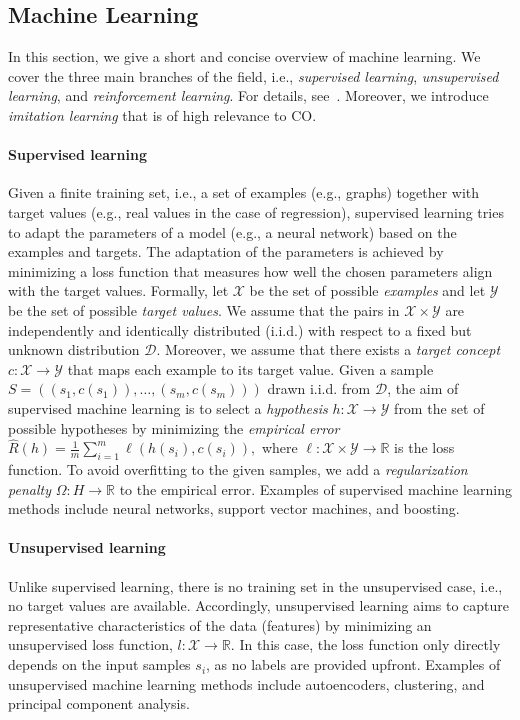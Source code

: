 \documentclass[twoside,11pt]{article}
\newcommand{\new}[1]{\emph{#1}}
\newcommand{\bbR}{\ensuremath{\mathbb{R}}}
\newcommand{\RR}{\mathbb{R}}
\begin{document}
\subsection{Machine Learning}
\label{sec:mlparadigms}

In this section, we give a short and concise overview of machine learning. We cover the three main branches of the field, i.e., \new{supervised learning}, \new{unsupervised learning}, and \new{reinforcement learning}. For details, see~\cite{Moh+2012,Shalev-Shwartz2014}. Moreover, we introduce \new{imitation learning} that is of high relevance to CO.

\paragraph{Supervised learning} Given a finite training set, i.e., a set of examples (e.g., graphs) together with target values (e.g., real values in the case of regression), supervised learning tries to adapt the parameters of a model (e.g., a neural network) based on the examples and targets. The adaptation of the parameters is achieved by minimizing a loss function that measures how well the chosen parameters align with the target values.
Formally, let $\mathcal{X}$ be the set of possible \new{examples} and let $\mathcal{Y}$ be the set of possible \new{target values}. We assume that the pairs in $\mathcal{X} \times \mathcal{Y}$ are independently and identically distributed (i.i.d.) with respect to a fixed but unknown distribution $\mathcal{D}$. Moreover, we assume that there exists a \new{target concept} $c\colon \mathcal{X} \to \mathcal{Y}$ that maps each example to its target value. Given a sample $S = ((s_1,c(s_1)), \dots, (s_m,c(s_m)))$ drawn i.i.d. from $\mathcal{D}$, the aim of supervised machine learning is to select a \new{hypothesis} $h \colon \mathcal{X} \to \mathcal{Y}$ from the set of possible hypotheses by minimizing the \new{empirical error}
$\widehat{R}(h) = \frac{1}{m} \sum_{i=1}^m \ell(h(s_i), c(s_i)),$ where $\ell \colon \mathcal{X} \times \mathcal{Y}\to \RR$ is the loss function. To avoid overfitting to the given samples, we add a \new{regularization penalty} $\Omega \colon H \to \bbR$ to the empirical error. Examples of supervised machine learning methods include neural networks, support vector machines, and boosting.

\paragraph{Unsupervised learning} Unlike supervised learning, there is no training set in the unsupervised case, i.e., no target values are available. Accordingly, unsupervised learning aims to capture representative characteristics of the data ({features}) by minimizing an unsupervised loss function, $l \colon \mathcal{X} \to \RR$. In this case, the loss function only directly depends on the input samples $s_i$, as no labels are provided upfront. Examples of unsupervised machine learning methods include autoencoders, clustering, and principal component analysis.
\end{document}

